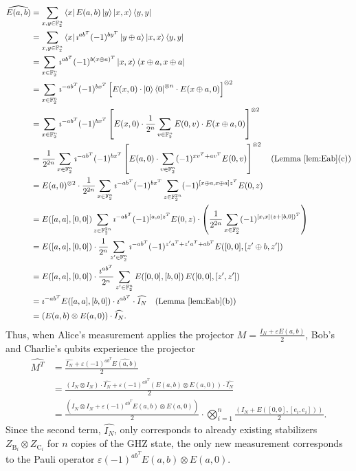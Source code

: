 \documentclass[journal,onecolumn]{IEEEtran}
\newcommand{\ghzmap}[1]{\widehat{#1}}
\newcommand{\dket}[1]{\left\lvert #1 \right\rangle}
\newcommand{\dbra}[1]{\left\langle #1 \right\rvert}
\begin{document}
\begin{align}
\ghzmap{E(a,b)} & = \sum_{x,y \in \mathbb{F}_2^n} \dbra{x} E(a,b) \dket{y} \dketbra{x,x}{y,y} \\
%
  & = \sum_{x,y \in \mathbb{F}_2^n} \dbra{x} \imath^{ab^T} (-1)^{by^T} \dket{y \oplus a} \dketbra{x,x}{y,y} \\
%
  & = \sum_{x \in \mathbb{F}_2^n} \imath^{ab^T} (-1)^{b (x \oplus a)^T} \dketbra{x,x}{x \oplus a, x \oplus a} \\
%
  & = \sum_{x \in \mathbb{F}_2^n} \imath^{-ab^T} (-1)^{b x^T} \left[ E(x,0) \cdot \dketbra{0}^{\otimes n} \cdot E(x \oplus a, 0) \right]^{\otimes 2} \\
%
  & = \sum_{x \in \mathbb{F}_2^n} \imath^{-ab^T} (-1)^{b x^T} \left[ E(x,0) \cdot \frac{1}{2^n} \sum_{v \in \mathbb{F}_2^n} E(0,v) \cdot E(x \oplus a, 0) \right]^{\otimes 2} \\ 
%
  & = \frac{1}{2^{2n}} \sum_{x \in \mathbb{F}_2^n} \imath^{-ab^T} (-1)^{b x^T} \left[ E(a,0) \cdot \sum_{v \in \mathbb{F}_2^n} (-1)^{xv^T + av^T} E(0,v) \right]^{\otimes 2} \quad (\text{Lemma~\ref{lem:Eab}(c)}) \\
%
  & = E(a,0)^{\otimes 2} \cdot \frac{1}{2^{2n}} \sum_{x \in \mathbb{F}_2^n} \imath^{-ab^T} (-1)^{b x^T} \sum_{z \in \mathbb{F}_2^{2n}} (-1)^{[x \oplus a, x \oplus a] z^T} E(0,z) \\
%
  & = E([a,a],[0,0]) \sum_{z \in \mathbb{F}_2^{2n}} \imath^{-ab^T} (-1)^{[a,a] z^T} E(0,z) \cdot \left( \frac{1}{2^{2n}} \sum_{x \in \mathbb{F}_2^n} (-1)^{[x,x] (z + [b,0])^T} \right) \\
%
  & = E([a,a],[0,0]) \cdot \frac{1}{2^n} \sum_{z' \in \mathbb{F}_2^{n}} \imath^{-ab^T} (-1)^{z'a^T + z'a^T + ab^T} E([0,0],[z' \oplus b, z']) \\
%
  & = E([a,a],[0,0]) \cdot \frac{\imath^{ab^T}}{2^n} \sum_{z' \in \mathbb{F}_2^{n}} E([0,0],[b,0]) \,  E([0,0],[z', z']) \\
%
  & = \imath^{-ab^T} E([a,a],[b,0]) \cdot \imath^{ab^T} \cdot \ghzmap{I_N} \quad (\text{Lemma~\ref{lem:Eab}(b)}) \\
%
  & = \left( E(a,b) \otimes E(a,0) \right) \cdot \ghzmap{I_N}.
\end{align}
Thus, when Alice's measurement applies the projector $M = \frac{I_N + \varepsilon E(a,b)}{2}$, Bob's and Charlie's qubits experience the projector
\begin{align}
\ghzmap{M^T} & = \frac{\ghzmap{I_N} + \varepsilon (-1)^{ab^T} \ghzmap{E(a,b)}}{2} \\
%
  & = \frac{\left( I_N \otimes I_N \right) \cdot \ghzmap{I_N} + \varepsilon (-1)^{ab^T} \left( E(a,b) \otimes E(a,0) \right) \cdot \ghzmap{I_N}}{2} \\
%
  & = \frac{ \left( I_N \otimes I_N + \varepsilon (-1)^{ab^T} E(a,b) \otimes E(a,0) \right) }{2} \cdot \bigotimes_{i=1}^n \frac{\left( I_N + E([0,0],[e_i,e_i]) \right)}{2}.
\end{align}
Since the second term, $\ghzmap{I_N}$, only corresponds to already existing stabilizers $Z_{\text{B}_i} \otimes Z_{\text{C}_i}$ for $n$ copies of the GHZ state, the only new measurement corresponds to the Pauli operator $\varepsilon (-1)^{ab^T} E(a,b) \otimes E(a,0)$. \hfill \IEEEQEDhere
\end{document}
